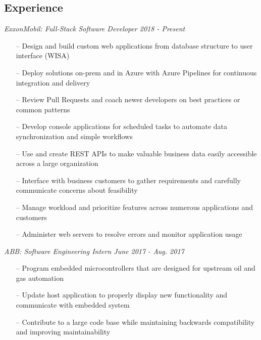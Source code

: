 \documentclass[line,overlapped,9pt]{res}
\begin{document}
\setlength\itemsep{.25em}
\address{23550 Northgate Crossing Boulevard: APT 153 Spring, Texas, 77373}
\address{Mobile: (918)440-3563, Email: kllinzy1@gmail.com}

\begin{resume}

  \section{Experience} {\sl ExxonMobil: Full-Stack Software Developer \hfill 2018 - \sl Present}
                 \begin{itemize}   %
                 \item[--] Design and build custom web applications from database structure to user interface (WISA)
                 \item[--] Deploy solutions on-prem and in Azure with Azure Pipelines for continuous integration
                   and delivery
                 \item[--] Review Pull Requests and coach newer developers on best practices or common patterns
                 \item[--] Develop console applications for scheduled tasks to automate data synchronization
                   and simple workflows
                 \item[--] Use and create REST APIs to make valuable business data easily accessible across
                   a large organization 
                 \item[--] Interface with business customers to gather requirements and carefully communicate
                   concerns about feasibility
                 \item[--] Manage workload and prioritize features across numerous applications and customers
                \item[--] Administer web servers to resolve errors and monitor application usage
                 \end{itemize}
                 
                 {\sl ABB: Software Engineering Intern  \hfill June 2017 - Aug. 2017 }
                 \begin{itemize}  %
                 \item[--] Program embedded microcontrollers that are designed for upstream
                   oil and gas automation 
                 \item[--] Update host application to properly display new functionality and
                   communicate with embedded system
                 \item[--] Contribute to a large code base while maintaining
                   backwards compatibility and improving maintainability
                 \end{itemize} 


\end{resume}
\end{document}
